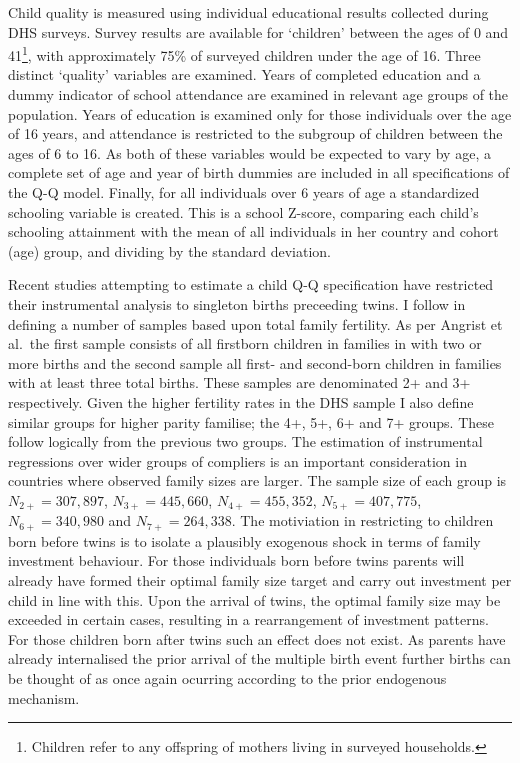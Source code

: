 \documentclass{article}[11pt,subeqn]
\begin{document}
\begin{spacing}{1.5}
\begin{table}[ht]
\begin{center}
\begin{tabular}{lccp{5mm}ccp{5mm}cc}
\end{tabular}
\end{center}
\end{table}

Child quality is measured using individual educational results collected during DHS surveys.   Survey results are available for `children' 
between the ages of 0 and 41\footnote{Children refer to any offspring of 
mothers living in surveyed households.}, with approximately 75\% of surveyed children 
under the age of 16. Three distinct `quality' variables are examined.  Years of completed education and a dummy indicator of school attendance
are examined in relevant age groups of the population.  Years of education is examined only for those individuals over the age of 16 years, and
attendance is restricted to the subgroup of children between the ages of 6 to 16.     As both of these 
variables would be expected to vary by age, a complete set of age and year of birth dummies are included in all specifications of the Q-Q model.  
Finally, for all individuals over 6 years of age a standardized schooling variable is created.  This is a school Z-score, comparing each child's
schooling attainment with the mean of all individuals in her country and cohort (age) group, and dividing by the standard deviation.  

Recent studies attempting to estimate a child Q-Q specification have restricted their instrumental analysis to singleton births preceeding 
twins.  I follow \citet{Angristetal2010} in defining a number of samples based upon total family fertility.  As per Angrist et al.\ the first sample 
consists of all firstborn children in families in with two or more births and the second sample all first- and second-born children in families 
with at least three total births.  These samples are denominated 2+ and 3+ respectively.  Given the higher fertility rates in the DHS sample I also 
define similar groups for higher parity familise; the 4+, 5+, 6+ and 7+ groups.  These follow logically from the previous two groups.  The estimation 
of instrumental regressions over wider groups of compliers is an important consideration in countries where observed family sizes are larger.  The 
sample size of each group is $N_{2+}= 307,897$, $N_{3+}=445,660$, $N_{4+}= 455,352$, $N_{5+}=407,775$, $N_{6+}=340,980$ and $N_{7+}=264,338$.  
The motiviation 
in restricting to children born before twins is to isolate a plausibly exogenous shock in terms of family investment behaviour.  For those 
individuals born before twins parents will already have formed their optimal family size target and carry out investment per child in line 
with this.  Upon the arrival of twins, the optimal family size may be exceeded in certain cases, resulting in a rearrangement of investment 
patterns.  For those children born after twins such an effect does not exist.  As parents have already internalised the prior arrival of the 
multiple birth event further births can be thought of as once again ocurring according to the prior endogenous mechanism.


\end{spacing}
\end{document}
